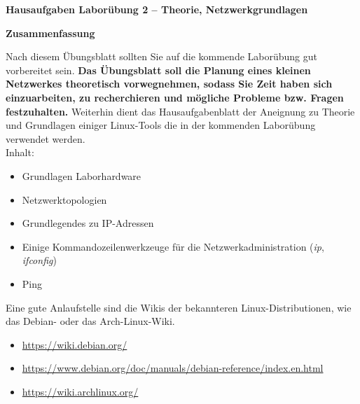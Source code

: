 \documentclass[paper=a4,fontsize=11pt]{scrartcl}%
\numberwithin{equation}{section}
\begin{document}
\begin{center}
\Large{\textbf{Hausaufgaben Laborübung 2 -- Theorie, Netzwerkgrundlagen}}
\end{center}
\begin{center}\Large{\textbf{Zusammenfassung}}\end{center}
Nach diesem Übungsblatt sollten Sie auf die kommende Laborübung gut vorbereitet sein. \textbf{Das Übungsblatt soll die Planung eines kleinen Netzwerkes theoretisch vorwegnehmen, sodass Sie Zeit haben sich einzuarbeiten, zu recherchieren und mögliche Probleme bzw. Fragen festzuhalten.} Weiterhin dient das Hausaufgabenblatt der Aneignung zu Theorie und Grundlagen einiger Linux-Tools die in der kommenden Laborübung verwendet werden.\\
Inhalt:
\begin{itemize}
	\item Grundlagen Laborhardware
	\item Netzwerktopologien
	\item Grundlegendes zu IP-Adressen
	\item Einige Kommandozeilenwerkzeuge für die Netzwerkadministration (\emph{ip}, \emph{ifconfig})
	\item Ping
\end{itemize}
Eine gute Anlaufstelle sind die Wikis der bekannteren Linux-Distributionen, wie das Debian- oder das Arch-Linux-Wiki.
\begin{itemize}
	\item \url{https://wiki.debian.org/}
	\item \url{https://www.debian.org/doc/manuals/debian-reference/index.en.html}
	\item \url{https://wiki.archlinux.org/}
\end{itemize}
\end{document}
